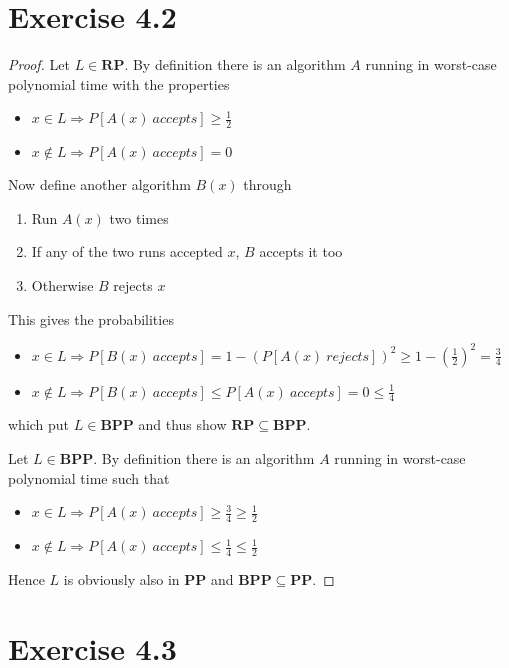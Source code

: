 \documentclass[10pt,a4paper]{article}
\begin{document}
\section*{Exercise 4.2}

\begin{proof}
  Let $L \in \mathbf{RP}$.
  By definition there is an algorithm $A$ running in worst-case polynomial time with the properties
  \begin{itemize}
  \item $x \in L \Rightarrow P[A(x)\ accepts] \ge \frac{1}{2}$
  \item $x \notin L \Rightarrow P[A(x)\ accepts] = 0$
  \end{itemize}
  Now define another algorithm $B(x)$ through
  \begin{enumerate}
  \item Run $A(x)$ two times
  \item If any of the two runs accepted $x$, $B$ accepts it too
  \item Otherwise $B$ rejects $x$
  \end{enumerate}
  This gives the probabilities
  \begin{itemize}
  \item $x \in L \Rightarrow P[B(x)\ accepts] = 1 - (P[A(x)\ rejects])^{2} \ge 1 - \left( \frac{1}{2} \right)^{2} = \frac{3}{4}$
  \item $x \notin L \Rightarrow P[B(x)\ accepts] \le P[A(x)\ accepts] = 0 \le \frac{1}{4}$
  \end{itemize}
  which put $L \in \mathbf{BPP}$ and thus show $\mathbf{RP} \subseteq \mathbf{BPP}$.

  \vspace{1em}

  Let $L \in \mathbf{BPP}$.
  By definition there is an algorithm $A$ running in worst-case polynomial time such that
  \begin{itemize}
  \item $x \in L \Rightarrow P[A(x)\ accepts] \ge \frac{3}{4} \ge \frac{1}{2}$
  \item $x \not\in L \Rightarrow P[A(x)\ accepts] \le \frac{1}{4} \le \frac{1}{2}$
  \end{itemize}
  Hence $L$ is obviously also in $\mathbf{PP}$ and $\mathbf{BPP} \subseteq \mathbf{PP}$.
\end{proof}

\section*{Exercise 4.3}
\end{document}
